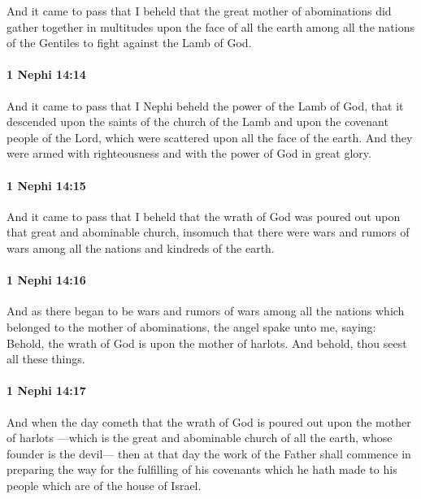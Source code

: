 			And it came to pass that I beheld that the great mother of abominations
			did gather together in multitudes upon the face of all the earth
			among all the nations of the Gentiles
			to fight against the Lamb of God.

		\paragraph{1 Nephi 14:14} %
			\label{1NEPHI-14-14}

			And it came to pass that I Nephi beheld the power of the Lamb of God,
			that it descended upon the saints of the church of the Lamb
			and upon the covenant people of the Lord,
			which were scattered upon all the face of the earth.
			And they were armed with righteousness
			and with the power of God in great glory.

		\paragraph{1 Nephi 14:15} %
			\label{1NEPHI-14-15}

			And it came to pass that I beheld that
			the wrath of God was poured out upon that great and abominable church,
			insomuch that there were wars and rumors of wars
			among all the nations and kindreds of the earth.

		\paragraph{1 Nephi 14:16} %
			\label{1NEPHI-14-16}

			And as there began to be wars and rumors of wars
			among all the nations which belonged to the mother of abominations,
			the angel spake unto me, saying:
			Behold, the wrath of God is upon the mother of harlots.
			And behold, thou seest all these things.

		\paragraph{1 Nephi 14:17} %
			\label{1NEPHI-14-17}

			And when the day cometh
			that the wrath of God is poured out upon the mother of harlots
			---which is the great and abominable church of all the earth,
			whose founder is the devil---
			then at that day the work of the Father shall commence
			in preparing the way for the fulfilling of his covenants
			which he hath made to his people which are of the house of Israel.

